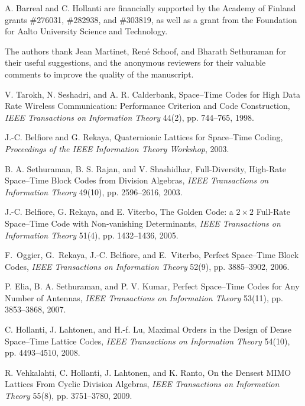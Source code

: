 \documentclass[smallextended]{svjour3}
\begin{document}
\begin{acknowledgements}
A. Barreal and C. Hollanti are financially supported by the Academy of Finland grants \#276031, \#282938, and \#303819, as well as a grant from the Foundation for Aalto University Science and Technology.

\medskip 
The authors thank Jean Martinet, Ren\'e Schoof, and Bharath Sethuraman for their useful suggestions, and the anonymous reviewers for their valuable comments to improve the quality of the manuscript. 
\end{acknowledgements}

\begin{thebibliography}{99}

V. Tarokh, N. Seshadri, and A. R. Calderbank, 
Space--Time Codes for High Data Rate Wireless Communication: Performance Criterion and Code Construction, 
\textit{IEEE Transactions on Information Theory} 44(2), pp. 744--765, 1998.

J.-C. Belfiore and G. Rekaya, 
Quaternionic Lattices for Space--Time Coding,
\textit{Proceedings of the IEEE Information Theory Workshop}, 2003.

B. A. Sethuraman, B. S. Rajan, and V. Shashidhar, 
Full-Diversity, High-Rate Space--Time Block Codes from Division Algebras, 
\textit{IEEE Transactions on Information Theory} 49(10), pp. 2596--2616, 2003.

J.-C. Belfiore, G. Rekaya, and E. Viterbo,
The Golden Code: a $2\times 2$ Full-Rate Space--Time Code with Non-vanishing Determinants, 
\textit{IEEE Transactions on Information Theory} 51(4), pp. 1432--1436, 2005.

F.~Oggier, G.~Rekaya, J.-C. Belfiore, and E.~Viterbo, 
Perfect Space--Time Block Codes, 
\textit{IEEE Transactions on Information Theory} 52(9), pp. 3885--3902, 2006.

P. Elia, B. A. Sethuraman, and P. V. Kumar, 
Perfect Space--Time Codes for Any Number of Antennas, 
\textit{IEEE Transactions on Information Theory} 53(11), pp. 3853--3868, 2007.

C. Hollanti, J. Lahtonen, and H.-f. Lu, 
Maximal Orders in the Design of Dense Space--Time Lattice Codes,
\textit{IEEE Transactions on Information Theory} 54(10), pp. 4493--4510, 2008.

R. Vehkalahti, C. Hollanti, J. Lahtonen, and K. Ranto, 
On the Densest MIMO Lattices From Cyclic Division Algebras, 
\textit{IEEE Transactions on Information Theory} 55(8), pp. 3751--3780, 2009.


\end{thebibliography}
\end{document}
